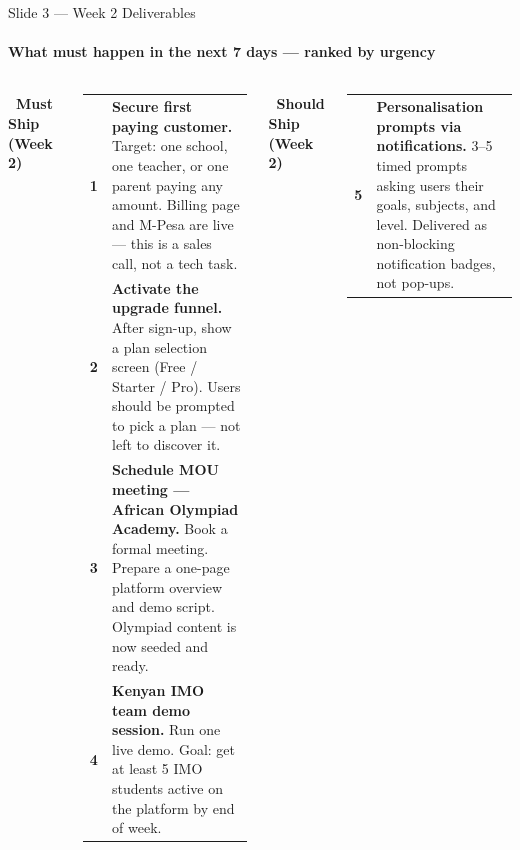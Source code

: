 \documentclass[aspectratio=169,13pt]{beamer}
\begin{document}
\begin{frame}{Slide 3 — Week 2 Deliverables}
\framesubtitle{What must happen in the next 7 days — ranked by urgency}

\begin{columns}[T]

  \textcolor{rose}{\textbf{\faFire\ Must Ship (Week 2)}}\\[5pt]

  \begin{tabular}{@{}p{0.07\linewidth}p{0.85\linewidth}@{}}

    \textbf{\textcolor{rose}{1}} &
      \scriptsize \textbf{Secure first paying customer.}
      Target: one school, one teacher, or one parent paying any amount.
      Billing page and M-Pesa are live — this is a sales call, not a tech task.\\[6pt]

    \textbf{\textcolor{rose}{2}} &
      \scriptsize \textbf{Activate the upgrade funnel.}
      After sign-up, show a plan selection screen (Free / Starter / Pro).
      Users should be prompted to pick a plan — not left to discover it.\\[6pt]

    \textbf{\textcolor{amber}{3}} &
      \scriptsize \textbf{Schedule MOU meeting — African Olympiad Academy.}
      Book a formal meeting. Prepare a one-page platform overview
      and demo script. Olympiad content is now seeded and ready.\\[6pt]

    \textbf{\textcolor{amber}{4}} &
      \scriptsize \textbf{Kenyan IMO team demo session.}
      Run one live demo. Goal: get at least 5 IMO students active on
      the platform by end of week.\\[6pt]

  \end{tabular}

  \textcolor{amber}{\textbf{\faStar\ Should Ship (Week 2)}}\\[5pt]

  \begin{tabular}{@{}p{0.07\linewidth}p{0.85\linewidth}@{}}

    \textbf{\textcolor{amber}{5}} &
      \scriptsize \textbf{Personalisation prompts via notifications.}
      3–5 timed prompts asking users their goals, subjects, and level.
      Delivered as non-blocking notification badges, not pop-ups.\\[6pt]


\end{tabular}
\end{columns}
\end{frame}
\end{document}
